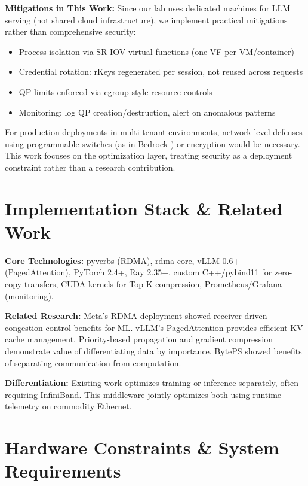 \documentclass[10pt,letterpaper]{article}
\begin{document}
\textbf{Mitigations in This Work:} Since our lab uses dedicated machines for LLM serving (not shared cloud infrastructure), we implement practical mitigations rather than comprehensive security:

\begin{itemize}[nosep]
\item Process isolation via SR-IOV virtual functions (one VF per VM/container)
\item Credential rotation: rKeys regenerated per session, not reused across requests
\item QP limits enforced via cgroup-style resource controls
\item Monitoring: log QP creation/destruction, alert on anomalous patterns
\end{itemize}

For production deployments in multi-tenant environments, network-level defenses using programmable switches (as in Bedrock \cite{bedrock}) or encryption would be necessary. This work focuses on the optimization layer, treating security as a deployment constraint rather than a research contribution.

\section{Implementation Stack \& Related Work}

\textbf{Core Technologies:} pyverbs (RDMA), rdma-core, vLLM 0.6+ (PagedAttention), PyTorch 2.4+, Ray 2.35+, custom C++/pybind11 for zero-copy transfers, CUDA kernels for Top-K compression, Prometheus/Grafana (monitoring).

\textbf{Related Research:} Meta's RDMA deployment \cite{meta-rdma} showed receiver-driven congestion control benefits for ML. vLLM's PagedAttention \cite{vllm} provides efficient KV cache management. Priority-based propagation \cite{p3} and gradient compression \cite{powersgd,accordion} demonstrate value of differentiating data by importance. BytePS \cite{byteps} showed benefits of separating communication from computation.

\textbf{Differentiation:} Existing work optimizes training \cite{meta-rdma,byteps,zero} or inference \cite{vllm,sglang,distserve} separately, often requiring InfiniBand. This middleware jointly optimizes both using runtime telemetry on commodity Ethernet.

\section{Hardware Constraints \& System Requirements}
\end{document}
